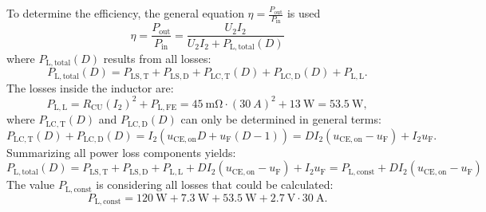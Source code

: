 \begin{solutionblock}
To determine the efficiency, the general equation $\eta=\frac{P_{\mathrm{out}}}{P_{\mathrm{in}}}$ is used
\begin{equation}
    \eta=\frac{P_{\mathrm{out}}}{P_{\mathrm{in}}} = \frac{U_\mathrm{2} I_\mathrm{2}}{U_\mathrm{2} I_\mathrm{2} + P_{\mathrm{L,total}}(D)}
\end{equation}
where $P_{\mathrm{L,total}}(D)$ results from all losses:
\begin{equation}
    P_{\mathrm{L,total}}(D) =  P_{\mathrm{LS,T}} +  P_{\mathrm{LS,D}} + P_{\mathrm{LC,T}}(D) + P_{\mathrm{LC,D}}(D) + P_{\mathrm{L,L}}.
\end{equation}
The losses inside the inductor are:
\begin{equation}
   P_{\mathrm{L,L}} = R_{\mathrm{CU}} (I_{\mathrm{2}})^2 + P_{\mathrm{L,FE}} = \SI{45}{\mohm} \cdot {(30\ \si{A})^2} + \SI {13}{\watt} = \SI {53.5}{\watt},
\end{equation}
where $P_{\mathrm{LC,T}}(D)$ and $P_{\mathrm{LC,D}}(D)$ can only be determined in general terms:
\begin{equation}
    P_{\mathrm{LC,T}}(D) + P_{\mathrm{LC,D}}(D) = I_2( u_{\mathrm{CE,on}} D + u_{\mathrm{F}}(D-1)) = D I_\mathrm{2}(u_{\mathrm{CE,on}} - u_{\mathrm{F}} ) + I_\mathrm{2} u_{\mathrm{F}}.
\end{equation}
Summarizing all power loss components yields:
\begin{equation}
    P_{\mathrm{L,total}}(D) = P_{\mathrm{LS,T}} +  P_{\mathrm{LS,D}} + P_{\mathrm{L,L}} + D I_\mathrm{2}(u_{\mathrm{CE,on}} - u_{\mathrm{F}} ) + I_\mathrm{2} u_{\mathrm{F}} =  P_{\mathrm{L,const}} + D I_\mathrm{2} (u_{\mathrm{CE,on}} - u_{\mathrm{F}})
\end{equation}
The value $P_{\mathrm{L,const}}$ is considering all losses that could be calculated:
\begin{equation}
    P_{\mathrm{L,const}} = \SI {120}{\watt} + \SI {7.3}{\watt} +\SI {53.5}{\watt} + \SI {2.7}{\volt}\cdot\SI {30}{\ampere}.
\end{equation}
\end{solutionblock}

